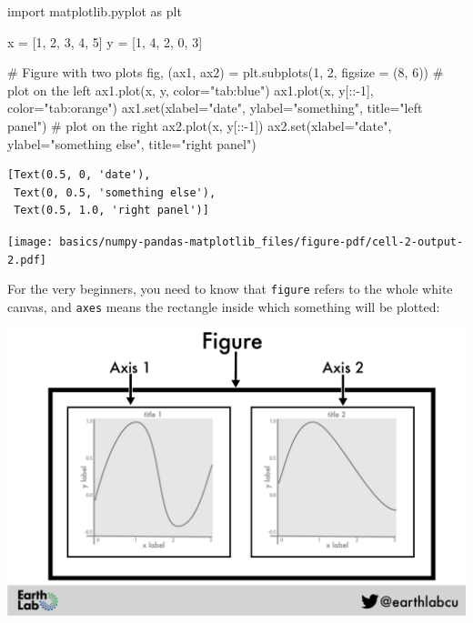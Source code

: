 \documentclass[
  letterpaper,
  DIV=11,
  numbers=noendperiod]{scrreprt}
\newenvironment{Shaded}{\begin{snugshade}}{\end{snugshade}}
\newcommand{\BuiltInTok}[1]{\textcolor[rgb]{0.00,0.23,0.31}{#1}}
\newcommand{\CommentTok}[1]{\textcolor[rgb]{0.37,0.37,0.37}{#1}}
\newcommand{\DecValTok}[1]{\textcolor[rgb]{0.68,0.00,0.00}{#1}}
\newcommand{\ImportTok}[1]{\textcolor[rgb]{0.00,0.46,0.62}{#1}}
\newcommand{\NormalTok}[1]{\textcolor[rgb]{0.00,0.23,0.31}{#1}}
\newcommand{\OperatorTok}[1]{\textcolor[rgb]{0.37,0.37,0.37}{#1}}
\newcommand{\StringTok}[1]{\textcolor[rgb]{0.13,0.47,0.30}{#1}}
\begin{document}
\begin{Shaded}
\begin{Highlighting}[]
\ImportTok{import}\NormalTok{ matplotlib.pyplot }\ImportTok{as}\NormalTok{ plt}

\NormalTok{x }\OperatorTok{=}\NormalTok{ [}\DecValTok{1}\NormalTok{, }\DecValTok{2}\NormalTok{, }\DecValTok{3}\NormalTok{, }\DecValTok{4}\NormalTok{, }\DecValTok{5}\NormalTok{]}
\NormalTok{y }\OperatorTok{=}\NormalTok{ [}\DecValTok{1}\NormalTok{, }\DecValTok{4}\NormalTok{, }\DecValTok{2}\NormalTok{, }\DecValTok{0}\NormalTok{, }\DecValTok{3}\NormalTok{]}

\CommentTok{\# Figure with two plots}
\NormalTok{fig, (ax1, ax2) }\OperatorTok{=}\NormalTok{ plt.subplots(}\DecValTok{1}\NormalTok{, }\DecValTok{2}\NormalTok{, figsize }\OperatorTok{=}\NormalTok{ (}\DecValTok{8}\NormalTok{, }\DecValTok{6}\NormalTok{))}
\CommentTok{\# plot on the left}
\NormalTok{ax1.plot(x, y, color}\OperatorTok{=}\StringTok{"tab:blue"}\NormalTok{)}
\NormalTok{ax1.plot(x, y[::}\OperatorTok{{-}}\DecValTok{1}\NormalTok{], color}\OperatorTok{=}\StringTok{"tab:orange"}\NormalTok{)}
\NormalTok{ax1.}\BuiltInTok{set}\NormalTok{(xlabel}\OperatorTok{=}\StringTok{"date"}\NormalTok{,}
\NormalTok{        ylabel}\OperatorTok{=}\StringTok{"something"}\NormalTok{,}
\NormalTok{        title}\OperatorTok{=}\StringTok{"left panel"}\NormalTok{)}
\CommentTok{\# plot on the right}
\NormalTok{ax2.plot(x, y[::}\OperatorTok{{-}}\DecValTok{1}\NormalTok{])}
\NormalTok{ax2.}\BuiltInTok{set}\NormalTok{(xlabel}\OperatorTok{=}\StringTok{"date"}\NormalTok{,}
\NormalTok{        ylabel}\OperatorTok{=}\StringTok{"something else"}\NormalTok{,}
\NormalTok{        title}\OperatorTok{=}\StringTok{"right panel"}\NormalTok{)}
\end{Highlighting}
\end{Shaded}

\begin{verbatim}
[Text(0.5, 0, 'date'),
 Text(0, 0.5, 'something else'),
 Text(0.5, 1.0, 'right panel')]
\end{verbatim}

\texttt{[image: basics/numpy-pandas-matplotlib\_files/figure-pdf/cell-2-output-2.pdf]}

For the very beginners, you need to know that \texttt{figure} refers to
the whole white canvas, and \texttt{axes} means the rectangle inside
which something will be plotted:

\includegraphics{basics/fig-2-plots.png}
\end{document}
